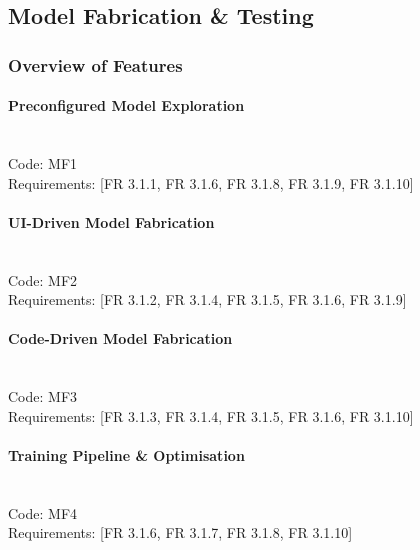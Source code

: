 \documentclass{article}
\begin{document}

\subsection{Model Fabrication \& Testing}
\subsubsection{Overview of Features}

\paragraph{Preconfigured Model Exploration} \mbox{} \\
\noindent Code: MF1 \\
\noindent Requirements: [FR 3.1.1, FR 3.1.6, FR 3.1.8, FR 3.1.9, FR 3.1.10] 

\paragraph{UI-Driven Model Fabrication}  \mbox{} \\
\noindent Code: MF2 \\
\noindent Requirements: [FR 3.1.2, FR 3.1.4, FR 3.1.5, FR 3.1.6, FR 3.1.9]

\paragraph{Code-Driven Model Fabrication} \mbox{} \\
\noindent Code: MF3 \\
\noindent Requirements: [FR 3.1.3, FR 3.1.4, FR 3.1.5, FR 3.1.6, FR 3.1.10]

\paragraph{Training Pipeline \& Optimisation} \mbox{} \\
\noindent Code: MF4 \\
\noindent Requirements: [FR 3.1.6, FR 3.1.7, FR 3.1.8, FR 3.1.10]
\end{document}
